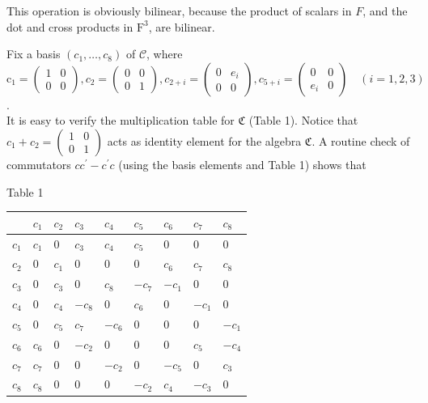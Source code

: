 \documentclass[10pt]{article}
\begin{document}
This operation is obviously bilinear, because the product of scalars in $F$, and the dot and cross products in $\mathrm{F}^{3}$, are bilinear.

Fix a basis $\left(c_{1}, \ldots, c_{8}\right)$ of $\mathcal{C}$, where\\
$\mathrm{c}_{1}=\left(\begin{array}{ll}1 & 0 \\ 0 & 0\end{array}\right), c_{2}=\left(\begin{array}{ll}0 & 0 \\ 0 & 1\end{array}\right), c_{2+i}=\left(\begin{array}{cc}0 & e_{i} \\ 0 & 0\end{array}\right), c_{5+i}=\left(\begin{array}{cc}0 & 0 \\ e_{i} & 0\end{array}\right) \quad(i=1,2,3)$.\\
It is easy to verify the multiplication table for $\mathfrak{C}$ (Table 1). Notice that $c_{1}+c_{2}=\left(\begin{array}{ll}1 & 0 \\ 0 & 1\end{array}\right)$ acts as identity element for the algebra $\mathfrak{C}$. A routine check of commutators $c c^{\prime}-c^{\prime} c$ (using the basis elements and Table 1) shows that

Table 1

\begin{center}
\begin{tabular}{|l|l|l|l|l|l|l|l|l|}
\hline
 & $c_{1}$ & $c_{2}$ & $c_{3}$ & $c_{4}$ & $c_{5}$ & $c_{6}$ & $c_{7}$ & $c_{8}$ \\
\hline
$c_{1}$ & $c_{1}$ & 0 & $c_{3}$ & $c_{4}$ & $c_{5}$ & 0 & 0 & 0 \\
\hline
$c_{2}$ & 0 & $c_{1}$ & 0 & 0 & 0 & $c_{6}$ & $c_{7}$ & $c_{8}$ \\
\hline
$c_{3}$ & 0 & $c_{3}$ & 0 & $c_{8}$ & $-c_{7}$ & $-c_{1}$ & 0 & 0 \\
\hline
$c_{4}$ & 0 & $c_{4}$ & $-c_{8}$ & 0 & $c_{6}$ & 0 & $-c_{1}$ & 0 \\
\hline
$c_{5}$ & 0 & $c_{5}$ & $c_{7}$ & $-c_{6}$ & 0 & 0 & 0 & $-c_{1}$ \\
\hline
$c_{6}$ & $c_{6}$ & 0 & $-c_{2}$ & 0 & 0 & 0 & $c_{5}$ & $-c_{4}$ \\
\hline
$c_{7}$ & $c_{7}$ & 0 & 0 & $-c_{2}$ & 0 & $-c_{5}$ & 0 & $c_{3}$ \\
\hline
$c_{8}$ & $c_{8}$ & 0 & 0 & 0 & $-c_{2}$ & $c_{4}$ & $-c_{3}$ & 0 \\
\hline
\end{tabular}
\end{center}
\end{document}
